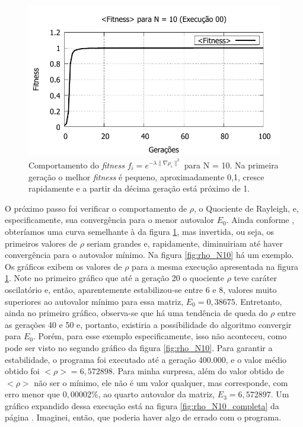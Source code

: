 	\begin{figure}[htbp]
		\centering
			\includegraphics{figs/resultados/fitnessGrad/N10_00_fitness.pdf}
			\caption{Comportamento do \textsl{fitness} $f_i = e^{-\lambda \| \nabla \rho_i \|^2}$ para N = 10. Na primeira geração o melhor \textit{fitness} é pequeno, aproximadamente 0,1, cresce rapidamente e a partir da décima geração está próximo de 1.}
		\label{fig:compFitnessTipo1N10}
	\end{figure}
	
	O próximo passo foi verificar o comportamento de $\rho$, o Quociente de Rayleigh, e, especificamente, sua convergência para o menor autovalor $E_0$. Ainda conforme \cite{metodo2004}, obteríamos uma curva semelhante à da figura \ref{fig:compFitnessTipo1N10}, mas invertida, ou seja, os primeiros valores de $\rho$ seriam grandes e, rapidamente, diminuiriam até haver convergência para o autovalor mínimo. Na figura \ref{fig:rho_N10} há um exemplo.	Os gráficos exibem os valores de $\rho$ para a mesma execução apresentada na figura \ref{fig:compFitnessTipo1N10}. Note no primeiro gráfico que até a geração 20 o quociente $\rho$ teve caráter oscilatório e, então, aparentemente estabilizou-se entre 6 e 8, valores muito superiores ao autovalor mínimo para essa matriz, $E_0 = 0,38675$. Entretanto, ainda no primeiro gráfico, observa-se que há uma tendência de queda do $\rho$ entre as gerações 40 e 50 e, portanto, existiria a possibilidade do algoritmo convergir para $E_0$. Porém, para esse exemplo especificamente, isso não aconteceu, como pode ser visto no segundo gráfico da figura \ref{fig:rho_N10}. Para garantir a estabilidade, o programa foi executado até a geração 400.000, e o valor médio obtido foi $<\rho> = 6,572898$. Para minha surpresa, além do valor obtido de $<\rho>$ não ser o mínimo, ele não é um valor qualquer, mas corresponde, com erro menor que $0,00002\%$, ao quarto autovalor da matriz, $E_3 = 6,572897$. Um gráfico expandido dessa execução está na figura \ref{fig:rho_N10_completa} da página \pageref{fig:rho_N10_completa}. Imaginei, então, que poderia haver algo de errado com o programa. 
	
